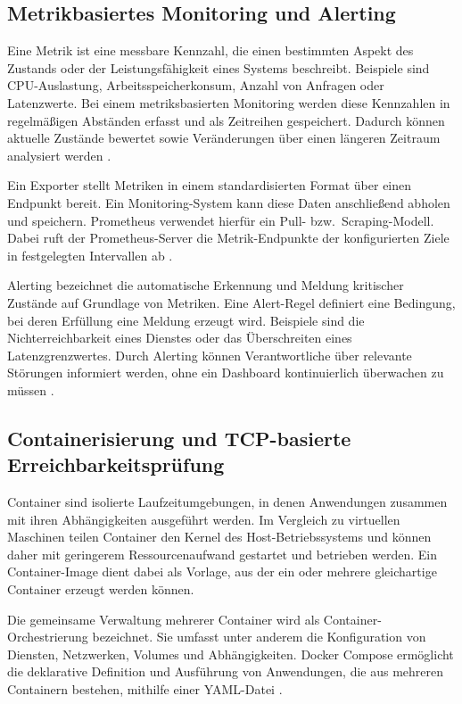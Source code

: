 \subsection{Metrikbasiertes Monitoring und Alerting}

Eine Metrik ist eine messbare Kennzahl, die einen bestimmten Aspekt des Zustands oder der Leistungsfähigkeit eines Systems beschreibt. Beispiele sind CPU-Auslastung, Arbeitsspeicherkonsum, Anzahl von Anfragen oder Latenzwerte. Bei einem metriksbasierten Monitoring werden diese Kennzahlen in regelmäßigen Abständen erfasst und als Zeitreihen gespeichert. Dadurch können aktuelle Zustände bewertet sowie Veränderungen über einen längeren Zeitraum analysiert werden \cite{monitoring:prometheus}.

Ein Exporter stellt Metriken in einem standardisierten Format über einen Endpunkt bereit. Ein Monitoring-System kann diese Daten anschließend abholen und speichern. Prometheus verwendet hierfür ein Pull- bzw.\ Scraping-Modell. Dabei ruft der Prometheus-Server die Metrik-Endpunkte der konfigurierten Ziele in festgelegten Intervallen ab \cite{prometheus:configuration}.

Alerting bezeichnet die automatische Erkennung und Meldung kritischer Zustände auf Grundlage von Metriken. Eine Alert-Regel definiert eine Bedingung, bei deren Erfüllung eine Meldung erzeugt wird. Beispiele sind die Nichterreichbarkeit eines Dienstes oder das Überschreiten eines Latenzgrenzwertes. Durch Alerting können Verantwortliche über relevante Störungen informiert werden, ohne ein Dashboard kontinuierlich überwachen zu müssen \cite{prometheus:alerting-overview}.

\subsection{Containerisierung und TCP-basierte Erreichbarkeitsprüfung}

Container sind isolierte Laufzeitumgebungen, in denen Anwendungen zusammen mit ihren Abhängigkeiten ausgeführt werden. Im Vergleich zu virtuellen Maschinen teilen Container den Kernel des Host-Betriebssystems und können daher mit geringerem Ressourcenaufwand gestartet und betrieben werden. Ein Container-Image dient dabei als Vorlage, aus der ein oder mehrere gleichartige Container erzeugt werden können.

Die gemeinsame Verwaltung mehrerer Container wird als Container-Orchestrierung bezeichnet. Sie umfasst unter anderem die Konfiguration von Diensten, Netzwerken, Volumes und Abhängigkeiten. Docker Compose ermöglicht die deklarative Definition und Ausführung von Anwendungen, die aus mehreren Containern bestehen, mithilfe einer YAML-Datei \cite{docker:compose}.

